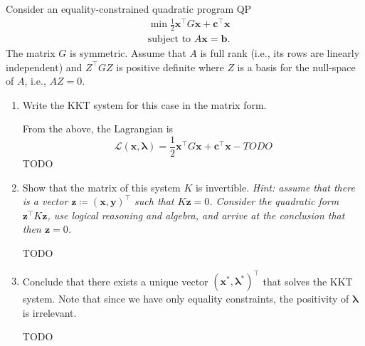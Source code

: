 \documentclass{../kin_math}
\begin{document}
\begin{questions}
  \question Consider an equality-constrained quadratic program QP
  \begin{align*}
    &\min \frac{1}{2} \textbf{x}^\top G \textbf{x} + \textbf{c}^\top \textbf{x} \\
    &\text{subject to } A \textbf{x} = \textbf{b}.
  \end{align*}
  The matrix $G$ is symmetric. Assume that $A$ is full rank (i.e., its rows are linearly independent) and $Z^\top GZ$ is positive definite where $Z$ is a basis for the null-space of $A$, i.e., $AZ = 0$.
  \begin{enumerate}
    \item Write the KKT system for this case in the matrix form.
    \begin{solution}
      From the above, the Lagrangian is
      \begin{equation*}
        \mathcal{L}(\textbf{x}, \boldsymbol{\lambda}) = \frac{1}{2} \textbf{x}^\top G \textbf{x} + \textbf{c}^\top \textbf{x} - TODO
      \end{equation*}
      TODO
    \end{solution}
    \item Show that the matrix of this system $K$ is invertible. \emph{Hint: assume that there is a vector $\textbf{z} \coloneqq (\textbf{x}, \textbf{y})^\top$ such that $K \textbf{z} = 0$. Consider the quadratic form $\textbf{z}^\top K \textbf{z}$, use logical reasoning and algebra, and arrive at the conclusion that then $\textbf{z} = 0$.}
    \begin{solution}
      TODO
    \end{solution}
    \item Conclude that there exists a unique vector $(\textbf{x}^*, \boldsymbol{\lambda}^*)^\top$ that solves the KKT system. Note that since we have only equality constraints, the positivity of $\boldsymbol{\lambda}$ is irrelevant.
    \begin{solution}
      TODO
    \end{solution}
  \end{enumerate}


\end{questions}
\end{document}
